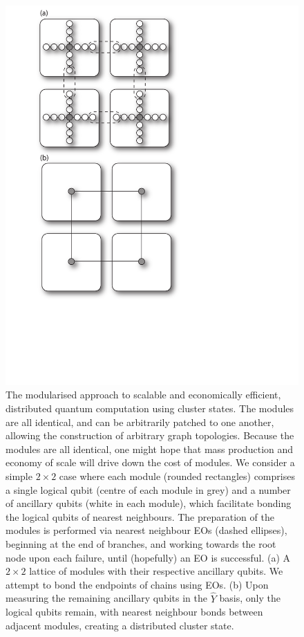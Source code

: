 \documentclass[aps,rmp,twocolumn,amsmath,amssymb,nofootinbib,superscriptaddress,longbibliography,floatfix,table-of-contents,eqsecnum]{revtex4-1}
\begin{document}
\begin{figure}[!htb]
\includegraphics[width=0.8\columnwidth]{module}
\caption{The modularised approach to scalable and economically efficient, distributed quantum computation using cluster states. The modules are all identical, and can be arbitrarily patched to one another, allowing the construction of arbitrary graph topologies. Because the modules are all identical, one might hope that mass production and economy of scale will drive down the cost of modules. We consider a simple \mbox{$2\times 2$} case where each module (rounded rectangles) comprises a single logical qubit (centre of each module in grey) and a number of ancillary qubits (white in each module), which facilitate bonding the logical qubits of nearest neighbours. The preparation of the modules is performed via nearest neighbour EOs (dashed ellipses), beginning at the end of branches, and working towards the root node upon each failure, until (hopefully) an EO is successful. (a) A \mbox{$2\times 2$} lattice of modules with their respective ancillary qubits. We attempt to bond the endpoints of chains using EOs. (b) Upon measuring the remaining ancillary qubits in the $\hat{Y}$ basis, only the logical qubits remain, with nearest neighbour bonds between adjacent modules, creating a distributed cluster state.} \label{fig:module}
\end{figure}
\end{document}
